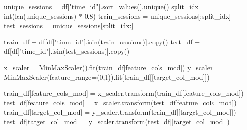 \documentclass[
  letterpaper,
  DIV=11,
  numbers=noendperiod]{scrartcl}
\newenvironment{Shaded}{\begin{snugshade}}{\end{snugshade}}
\newcommand{\BuiltInTok}[1]{\textcolor[rgb]{0.00,0.23,0.31}{#1}}
\newcommand{\DecValTok}[1]{\textcolor[rgb]{0.68,0.00,0.00}{#1}}
\newcommand{\FloatTok}[1]{\textcolor[rgb]{0.68,0.00,0.00}{#1}}
\newcommand{\NormalTok}[1]{\textcolor[rgb]{0.00,0.23,0.31}{#1}}
\newcommand{\OperatorTok}[1]{\textcolor[rgb]{0.37,0.37,0.37}{#1}}
\newcommand{\StringTok}[1]{\textcolor[rgb]{0.13,0.47,0.30}{#1}}
\begin{document}
\begin{Shaded}
\begin{Highlighting}[]
\NormalTok{unique\_sessions }\OperatorTok{=}\NormalTok{ df[}\StringTok{"time\_id"}\NormalTok{].sort\_values().unique()}
\NormalTok{split\_idx       }\OperatorTok{=} \BuiltInTok{int}\NormalTok{(}\BuiltInTok{len}\NormalTok{(unique\_sessions) }\OperatorTok{*} \FloatTok{0.8}\NormalTok{)          }
\NormalTok{train\_sessions  }\OperatorTok{=}\NormalTok{ unique\_sessions[:split\_idx]}
\NormalTok{test\_sessions   }\OperatorTok{=}\NormalTok{ unique\_sessions[split\_idx:]}
\end{Highlighting}
\end{Shaded}

\begin{Shaded}
\begin{Highlighting}[]
\NormalTok{train\_df }\OperatorTok{=}\NormalTok{ df[df[}\StringTok{"time\_id"}\NormalTok{].isin(train\_sessions)].copy()}
\NormalTok{test\_df  }\OperatorTok{=}\NormalTok{ df[df[}\StringTok{"time\_id"}\NormalTok{].isin(test\_sessions)].copy()}
\end{Highlighting}
\end{Shaded}

\begin{Shaded}
\begin{Highlighting}[]
\NormalTok{x\_scaler }\OperatorTok{=}\NormalTok{ MinMaxScaler().fit(train\_df[feature\_cols\_mod])}
\NormalTok{y\_scaler }\OperatorTok{=}\NormalTok{ MinMaxScaler(feature\_range}\OperatorTok{=}\NormalTok{(}\DecValTok{0}\NormalTok{,}\DecValTok{1}\NormalTok{)).fit(train\_df[[target\_col\_mod]])}

\NormalTok{train\_df[feature\_cols\_mod] }\OperatorTok{=}\NormalTok{ x\_scaler.transform(train\_df[feature\_cols\_mod])}
\NormalTok{test\_df[feature\_cols\_mod]  }\OperatorTok{=}\NormalTok{ x\_scaler.transform(test\_df[feature\_cols\_mod])}
\NormalTok{train\_df[target\_col\_mod]   }\OperatorTok{=}\NormalTok{ y\_scaler.transform(train\_df[[target\_col\_mod]])}
\NormalTok{test\_df[target\_col\_mod]    }\OperatorTok{=}\NormalTok{ y\_scaler.transform(test\_df[[target\_col\_mod]])}
\end{Highlighting}
\end{Shaded}
\end{document}
